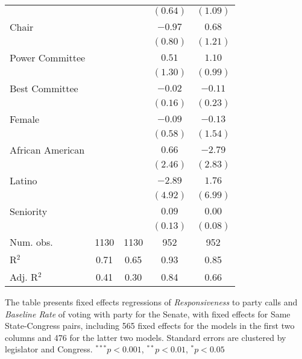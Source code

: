 \documentclass[12pt]{article}
\begin{document}
\begin{table}[!htbp]
\begin{threeparttable}
\begin{tabular}{l c c c c }
                                  &             &          & $(0.64)$    & $(1.09)$     \\
Chair                             &             &          & $-0.97$     & $0.68$       \\
                                  &             &          & $(0.80)$    & $(1.21)$     \\
Power Committee                   &             &          & $0.51$      & $1.10$       \\
                                  &             &          & $(1.30)$    & $(0.99)$     \\
Best Committee                    &             &          & $-0.02$     & $-0.11$      \\
                                  &             &          & $(0.16)$    & $(0.23)$     \\
Female                            &             &          & $-0.09$     & $-0.13$      \\
                                  &             &          & $(0.58)$    & $(1.54)$     \\
African American                  &             &          & $0.66$      & $-2.79$      \\
                                  &             &          & $(2.46)$    & $(2.83)$     \\
Latino                            &             &          & $-2.89$     & $1.76$       \\
                                  &             &          & $(4.92)$    & $(6.99)$     \\
Seniority                         &             &          & $0.09$      & $0.00$       \\
                                  &             &          & $(0.13)$    & $(0.08)$     \\
\hline
Num. obs.                         & 1130        & 1130     & 952          & 952          \\
R$^2$                             & 0.71        & 0.65     & 0.93         & 0.85         \\
Adj. R$^2$                        & 0.41        & 0.30     & 0.84         & 0.66         \\
\hline
\end{tabular}
\begin{tablenotes}
   \item
   The table presents fixed effects regressions of \textit{Responsiveness} to party calls and \textit {Baseline Rate} of voting with party for the Senate, with fixed effects for Same State-Congress pairs, including 565 fixed effects for the models in the first two columns and 476 for the latter two models.  Standard errors are clustered by legislator and Congress.
   $^{***}p<0.001$, $^{**}p<0.01$, $^*p<0.05$
 \end{tablenotes}
\end{threeparttable}
\end{table}

\clearpage



\end{document}
